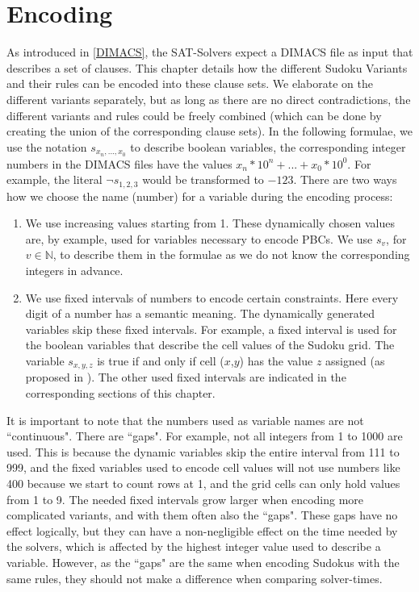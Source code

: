 \chapter{Encoding}\label{Encoding}
As introduced in \ref{DIMACS}, the SAT-Solvers expect a DIMACS file as input that describes a set of clauses. This chapter details how the different Sudoku Variants and their rules can be encoded into these clause sets. We elaborate on the different variants separately, but as long as there are no direct contradictions, the different variants and rules could be freely combined (which can be done by creating the union of the corresponding clause sets). In the following formulae, we use the notation $s_{x_{n},...,x_{0}}$ to describe boolean variables, the corresponding integer numbers in the DIMACS files have the values $x_{n}*10^{n}+...+x_{0}*10^{0}$. For example, the literal $\neg s_{1,2,3}$ would be transformed to $-123$. There are two ways how we choose the name (number) for a variable during the encoding process:

\begin{enumerate}
    \item We use increasing values starting from 1. These dynamically chosen values are, by example, used for variables necessary to encode PBCs. We use $s_{v}$, for $v \in \mathbb{N}$, to describe them in the formulae as we do not know the corresponding integers in advance.
    \item  We use fixed intervals of numbers to encode certain constraints. Here every digit of a number has a semantic meaning. The dynamically generated variables skip these fixed intervals. For example, a fixed interval is used for the boolean variables that describe the cell values of the Sudoku grid. The variable $s_{x,y,z}$ is true if and only if cell ($x$,$y$) has the value $z$ assigned (as proposed in \cite{Lynce2006SudokuAsASATProblem}). The other used fixed intervals are indicated in the corresponding sections of this chapter. 
\end{enumerate}

It is important to note that the numbers used as variable names are not ``continuous". There are ``gaps". For example, not all integers from 1 to 1000 are used. This is because the dynamic variables skip the entire interval from 111 to 999, and the fixed variables used to encode cell values will not use numbers like 400 because we start to count rows at 1, and the grid cells can only hold values from 1 to 9. The needed fixed intervals grow larger when encoding more complicated variants, and with them often also the ``gaps". These gaps have no effect logically, but they can have a non-negligible effect on the time needed by the solvers, which is affected by the highest integer value used to describe a variable. However, as the ``gaps" are the same when encoding Sudokus with the same rules, they should not make a difference when comparing solver-times.


